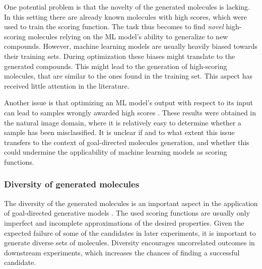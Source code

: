 One potential problem is that the novelty of the generated molecules is lacking. In this setting
there are already known molecules with high scores, which were used to train the scoring function.
The task thus becomes to find \emph{novel} high-scoring molecules relying on the ML model's ability
to generalize to new compounds. However, machine learning models are usually heavily biased towards
their training sets. During optimization these biases might translate to the generated compounds.
This might lead to the generation of high-scoring molecules, that are similar to the ones found in
the training set. This aspect has received little attention in the literature.

Another issue is that optimizing an ML model's output with respect to its input can lead to
samples wrongly awarded high scores \citep{szegedyIntriguingPropertiesNeural2014,goodfellowExplainingHarnessingAdversarial2015}.
These results were obtained in the natural image domain, where it is relatively easy to determine whether a
sample has been misclassified. It is unclear if and to what extent this issue transfers
to the context of goal-directed molecules generation, and whether this could undermine
the applicability of machine learning models as scoring functions.


\subsubsection{Diversity of generated molecules}
The diversity of the generated molecules is an important aspect in the application of goal-directed
generative models \citep{martinDiverseViewpointsComputational2001,gorseDiversityMedicinalChemistry2006}. The used scoring functions are usually only imperfect and incomplete
approximations of the desired properties. Given the expected failure of some of the candidates in
later experiments, it is important to generate diverse sets of molecules.
Diversity encourages uncorrelated outcomes in downstream experiments, which increases
the chances of finding a successful candidate.

